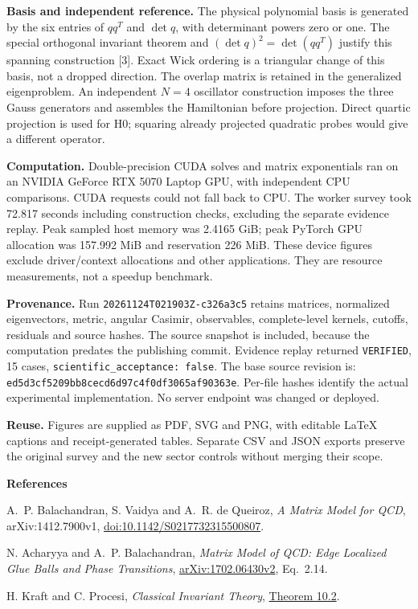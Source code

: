 \documentclass[11pt,letterpaper]{article}
\theoremstyle{plain}
\theoremstyle{definition}
\newcommand{\runid}{\texttt{20261124T021903Z-c326a3c5}}
\begin{document}
\textbf{Basis and independent reference.}
The physical polynomial basis is generated by the six entries of $qq^T$ and
$\det q$, with determinant powers zero or one. The special orthogonal invariant
theorem and $(\det q)^2=\det(qq^T)$ justify this spanning construction [3].
Exact Wick ordering is a triangular change of this basis, not a dropped direction.
The overlap matrix is retained in the generalized eigenproblem. An independent
$N=4$ oscillator construction imposes the three Gauss generators and assembles
the Hamiltonian before projection. Direct quartic projection is used for H0;
squaring already projected quadratic probes would give a different operator.

\textbf{Computation.}
Double-precision CUDA solves and matrix exponentials ran on an NVIDIA GeForce
RTX 5070 Laptop GPU, with independent CPU comparisons. CUDA requests could not
fall back to CPU. The worker survey took 72.817 seconds including construction
checks, excluding the separate evidence replay. Peak sampled host memory was
2.4165 GiB; peak PyTorch GPU allocation was 157.992 MiB and reservation 226 MiB.
These device figures exclude driver/context allocations and other applications.
They are resource measurements, not a speedup benchmark.

\textbf{Provenance.}
Run \runid{} retains matrices, normalized eigenvectors, metric, angular
Casimir, observables, complete-level kernels, cutoffs, residuals and source hashes.
The source snapshot is included, because the computation predates the publishing
commit. Evidence replay returned \texttt{VERIFIED}, 15 cases,
\texttt{scientific\_acceptance: false}. The base source revision is:\\
{\small\texttt{ed5d3cf5209bb8cecd6d97c4f0df3065af90363e}}. Per-file hashes identify
the actual experimental implementation. No server endpoint was changed or deployed.

\textbf{Reuse.} Figures are supplied as PDF, SVG and PNG, with editable LaTeX
captions and receipt-generated tables. Separate CSV and JSON exports preserve
the original survey and the new sector controls without merging their scope.

\vspace{5pt}
{\small\raggedright
\textbf{References}\par
[1] A.~P. Balachandran, S. Vaidya and A.~R. de Queiroz,
\emph{A Matrix Model for QCD}, arXiv:1412.7900v1,
\href{https://doi.org/10.1142/S0217732315500807}{doi:10.1142/S0217732315500807}.
\par [2] N. Acharyya and A.~P. Balachandran,
\emph{Matrix Model of QCD: Edge Localized Glue Balls and Phase Transitions},
\href{https://arxiv.org/abs/1702.06430v2}{arXiv:1702.06430v2}, Eq.~2.14.
\par [3] H. Kraft and C. Procesi, \emph{Classical Invariant Theory},
\href{https://dmi.unibas.ch/fileadmin/user_upload/dmi/Personen/Kraft_Hanspeter/Classical_Invariant_Theory.pdf}{Theorem 10.2}.
}
\end{document}
